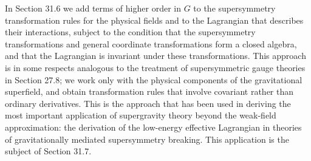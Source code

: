 In Section 31.6 we add terms of higher order in \(G\) to the supersymmetry
transformation rules for the physical fields and to the Lagrangian that
describes their interactions, subject to the condition that the supersymmetry
transformations and general coordinate transformations form a closed algebra,
and that the Lagrangian is invariant under these transformations. This
approach is in some respects analogous to the treatment of supersymmetric
gauge theories in Section 27.8; we work only with the physical components of
the gravitational superfield, and obtain transformation rules that involve
covariant rather than ordinary derivatives. This is the approach that has
been used in deriving the most important application of supergravity theory
beyond the weak-field approximation: the derivation of the low-energy
effective Lagrangian in theories of gravitationally mediated supersymmetry
breaking. This application is the subject of Section 31.7.
